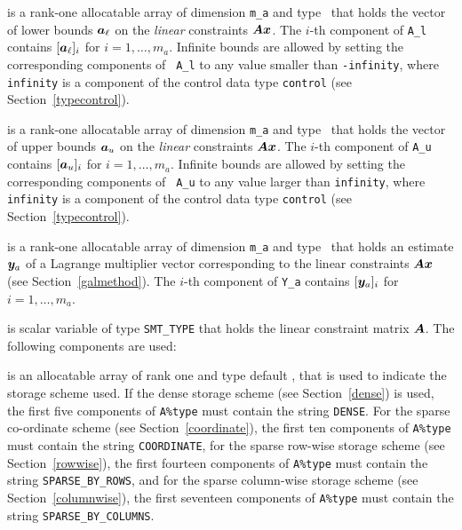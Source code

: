 \documentclass{galahad}
\begin{document}
\begin{description}
 is a rank-one allocatable array of dimension {\tt m\_a}
and type \realdp\ that holds the vector of lower bounds
${\bm{a}}_\ell$ on the {\em linear} constraints ${\bm{A}}{\bm{x}}$. The $i$-th component of
{\tt A\_l} contains $[{\bm{a}}_\ell]_i$ for $i = 1, \ldots , m_a$.  Infinite
bounds are allowed by setting the corresponding components of {\tt
  A\_l} to any value smaller than {\tt -infinity}, where {\tt
  infinity} is a component of the control data type {\tt control} (see
Section~\ref{typecontrol}).

  is a rank-one allocatable array of dimension {\tt m\_a}
and type \realdp\ that holds the vector of upper bounds
${\bm{a}}_u$ on the {\em linear} constraints ${\bm{A}}{\bm{x}}$. The $i$-th component of
{\tt A\_u} contains $[{\bm{a}}_u]_i$ for $i = 1, \ldots , m_a$.  Infinite
bounds are allowed by setting the corresponding components of {\tt
  A\_u} to any value larger than {\tt infinity}, where {\tt
  infinity} is a component of the control data type {\tt control} (see
Section~\ref{typecontrol}).

 is a rank-one allocatable array of dimension {\tt m\_a} and type 
\realdp\ that holds an estimate ${\bm{y}}_a$ of a Lagrange
multiplier vector corresponding to the linear constraints ${\bm{A}}{\bm{x}}$ (see Section~\ref{galmethod}).
The $i$-th component of {\tt Y\_a} contains $[{\bm{y}}_a]_{i}$ for $i = 1,
\ldots , m_a$.


 is scalar variable of type {\tt SMT\_TYPE} 
that holds the linear constraint matrix ${\bm{A}}$. The following components
are used:

\begin{description}

 is an allocatable array of rank one and type default 
\character, that
is used to indicate the storage scheme used. If the dense storage scheme 
(see Section~\ref{dense}) is used, 
the first five components of {\tt A\%type} must contain the
string {\tt DENSE}.
For the sparse co-ordinate scheme (see Section~\ref{coordinate}), 
the first ten components of {\tt A\%type} must contain the
string {\tt COORDINATE},  
for the sparse row-wise storage scheme (see Section~\ref{rowwise}),
the first fourteen components of {\tt A\%type} must contain the
string {\tt SPARSE\_BY\_ROWS},
and for the sparse column-wise storage scheme (see Section~\ref{columnwise}),
the first seventeen components of {\tt A\%type} must contain the
string {\tt SPARSE\_BY\_COLUMNS}.


\end{description}
\end{description}
\end{document}
